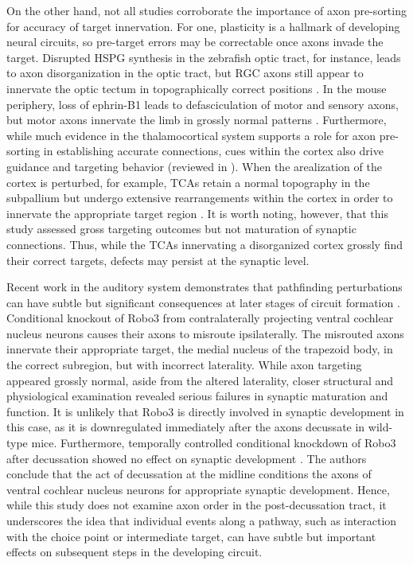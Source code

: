 On the other hand, not all studies corroborate the importance of axon pre-sorting for accuracy of target innervation.
For one, plasticity is a hallmark of developing neural circuits, so pre-target errors may be correctable once axons invade the target.
Disrupted HSPG synthesis in the zebrafish optic tract, for instance, leads to axon disorganization in the optic tract, but RGC axons still appear to innervate the optic tectum in topographically correct positions \cite{lee2004axon}.
In the mouse periphery, loss of ephrin-B1 leads to defasciculation of motor and sensory axons, but motor axons innervate the limb in grossly normal patterns \cite{luxey2013eph}.
Furthermore, while much evidence in the thalamocortical system supports a role for axon pre-sorting in establishing accurate connections, cues within the cortex also drive guidance and targeting behavior (reviewed in ).
When the arealization of the cortex is perturbed, for example, TCAs retain a normal topography in the subpallium but undergo extensive rearrangements within the cortex in order to innervate the appropriate target region \cite{shimogori2005fibroblast}.
It is worth noting, however, that this study assessed gross targeting outcomes but not maturation of synaptic connections.
Thus, while the TCAs innervating a disorganized cortex grossly find their correct targets, defects may persist at the synaptic level.

Recent work in the auditory system demonstrates that pathfinding perturbations can have subtle but significant consequences at later stages of circuit formation \cite{michalski2013robo3}.
Conditional knockout of Robo3 from contralaterally projecting ventral cochlear nucleus neurons causes their axons to misroute ipsilaterally.
The misrouted axons innervate their appropriate target, the medial nucleus of the trapezoid body, in the correct subregion, but with incorrect laterality. 
While axon targeting appeared grossly normal, aside from the altered laterality, closer structural and physiological examination revealed serious failures in synaptic maturation and function.
It is unlikely that Robo3 is directly involved in synaptic development in this case, as it is downregulated immediately after the axons decussate in wild-type mice. 
Furthermore, temporally controlled conditional knockdown of Robo3 after decussation showed no effect on synaptic development \cite{michalski2013robo3}.
The authors conclude that the act of decussation at the midline conditions the axons of ventral cochlear nucleus neurons for appropriate synaptic development.
Hence, while this study does not examine axon order in the post-decussation tract, it underscores the idea that individual events along a pathway, such as interaction with the choice point or intermediate target, can have subtle but important effects on subsequent steps in the developing circuit.
